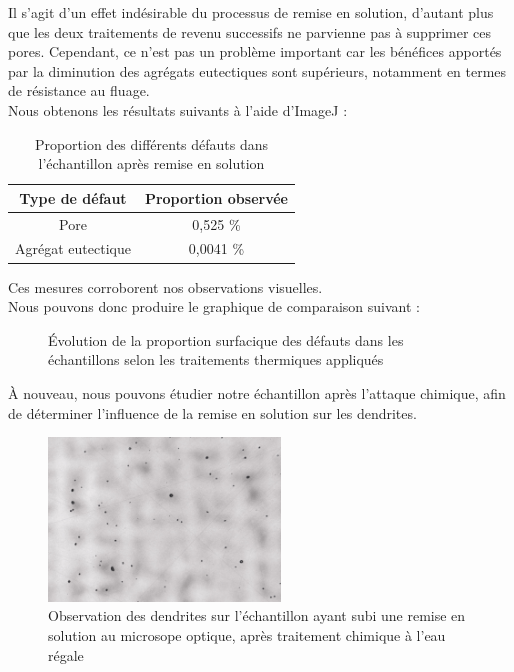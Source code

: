 Il s'agit d'un effet indésirable du processus de remise en solution, d'autant plus que 
les deux traitements de revenu successifs ne parvienne pas à supprimer ces pores. 
Cependant, ce n'est pas un problème important car les bénéfices apportés par la diminution des 
agrégats eutectiques sont supérieurs, notamment en termes de résistance au fluage. \\

Nous obtenons les résultats suivants à l'aide d'ImageJ :

\begin{table}[H]
    \centering
    \caption{Proportion des différents défauts dans l'échantillon après remise en solution}
    \begin{tabular}{|c|c|}
        \hline
        \textbf{Type de défaut}  & \textbf{Proportion observée}  \\
        \hline
        Pore               & 0,525  \% \\
        Agrégat eutectique & 0,0041 \% \\
        \hline
    \end{tabular}
    \label{fig:proportion_defauts_RES}
\end{table}

Ces mesures corroborent nos observations visuelles.\\

Nous pouvons donc produire le graphique de comparaison suivant :


\begin{figure}[H]
    \centering
    
    \caption{Évolution de la proportion surfacique des défauts dans les 
    échantillons selon les traitements thermiques appliqués\\}
    \label{fig:evolution_proportion_defauts_brut_RES}
\end{figure}

À nouveau, nous pouvons étudier notre échantillon après l'attaque chimique, 
afin de déterminer l'influence de la remise en solution sur les dendrites.\\

\begin{figure}[H]
    \centering
    \includegraphics[width = 0.55\textwidth]{images_optique/res_dendrites.pdf}
    \caption{Observation des dendrites sur l'échantillon ayant subi une remise en solution
    au microsope optique, après traitement chimique à l'eau régale\\}
    \label{fig:RES_dendrites_optique}
\end{figure}

